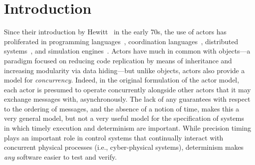 \documentclass[sigconf]{acmart}
\begin{document}

%




\maketitle 


\section{Introduction}\label{sec:intro}
Since their introduction by Hewitt~\cite{Hewitt:77:Actors} in the early 70s, the use of actors has proliferated 
in programming languages~\cite{Armstrong:96:Erlang,haller2009scala,desai2013p}, coordination languages~\cite{Arbab:04:Reo,ARC}, distributed systems~\cite{Hunt2018, DBLP:journals/corr/abs-1712-05889}, and simulation engines~\cite{Ptolemy:14:Book,DBLP:journals/fuin/SirjaniMSB04}. 
Actors have much in common with objects---a paradigm focused on reducing code replication 
by means of inheritance and increasing modularity via data hiding---but unlike %
objects, actors also provide a model for \emph{concurrency}. 
Indeed, in the original formulation of the actor model, each actor is presumed to operate concurrently alongside
other actors that it may exchange messages with, asynchronously. The lack of any guarantees
with respect to the ordering of messages, and the absence of a notion of time, makes this a
very general model, but not a very useful model for the specification of systems in which
timely execution and determinism are important. While precision timing plays an important role
in control systems that continually interact with concurrent physical processes (i.e., cyber-physical
systems), determinism makes \emph{any} software easier to test and verify.
\end{document}
